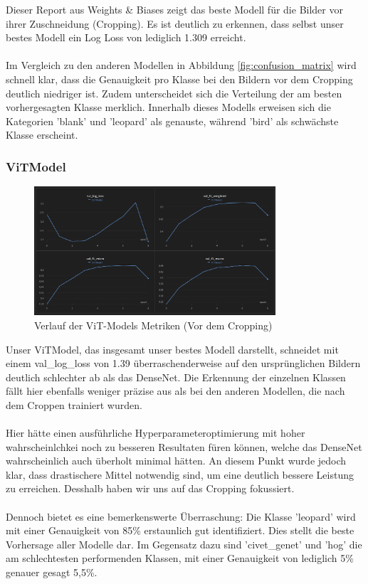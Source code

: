 \documentclass{article}
\begin{document}
Dieser Report aus Weights \& Biases zeigt das beste Modell für die Bilder vor ihrer Zuschneidung (Cropping). Es ist deutlich zu erkennen, dass selbst unser bestes Modell ein Log Loss von lediglich 1.309 erreicht.\\\\
Im Vergleich zu den anderen Modellen in Abbildung \ref{fig:confusion_matrix} wird schnell klar, dass die Genauigkeit pro Klasse bei den Bildern vor dem Cropping deutlich niedriger ist. Zudem unterscheidet sich die Verteilung der am besten vorhergesagten Klasse merklich. Innerhalb dieses Modells erweisen sich die Kategorien 'blank' und 'leopard' als genauste, während 'bird' als schwächste Klasse erscheint.

\subsubsection{ViTModel}

\begin{figure}[!h]
    \centering
    \includegraphics[width=0.8\textwidth]{plots/ViT_Model_wandb_before_cropping.png}
    \caption{\label{fig:wb_vitmodel_before_cropping}Verlauf der ViT-Models Metriken (Vor dem Cropping)}
\end{figure}

Unser ViTModel, das insgesamt unser bestes Modell darstellt, schneidet mit einem val\_log\_loss von 1.39 überraschenderweise auf den ursprünglichen Bildern deutlich schlechter ab als das DenseNet. Die Erkennung der einzelnen Klassen fällt hier ebenfalls weniger präzise aus als bei den anderen Modellen, die nach dem Croppen trainiert wurden. \\\\
Hier hätte einen ausführliche Hyperparameteroptimierung mit hoher wahrscheinlchkei noch zu besseren Resultaten füren können, welche das DenseNet wahrscheinlich auch überholt minimal hätten. An diesem Punkt wurde jedoch klar, dass drastischere Mittel notwendig sind, um eine deutlich bessere Leistung zu erreichen. Desshalb haben wir uns auf das Cropping fokussiert.\\\\
Dennoch bietet es eine bemerkenswerte Überraschung: Die Klasse 'leopard' wird mit einer Genauigkeit von 85\% erstaunlich gut identifiziert. Dies stellt die beste Vorhersage aller Modelle dar. Im Gegensatz dazu sind 'civet\_genet' und 'hog' die am schlechtesten performenden Klassen, mit einer Genauigkeit von lediglich 5\% genauer gesagt 5,5\%.
\end{document}
